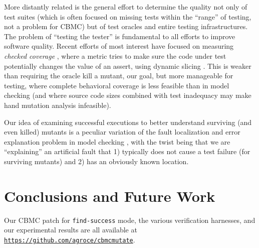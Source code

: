 \documentclass[conference]{IEEEtran}
\begin{document}
More distantly related is the general effort to determine the quality
not only of test suites (which is often focused on missing tests
within the ``range'' of testing, not a problem for CBMC) but of test
oracles and entire testing infrastructures.  The problem of ``testing
the tester'' \cite{WODA09} is fundamental to all efforts
to improve software quality.  Recent efforts of most interest have
focused on measuring \emph{checked coverage} \cite{CheckedCov,CheckedJournal,ThereYet}, where
a metric tries to make sure the code under test potentially changes
the value of an assert, using dynamic slicing \cite{DynSlice,Tip}.  This is weaker than requiring the oracle kill
a mutant, our goal, but more manageable for testing, where complete
behavioral coverage is less feasible than in model checking (and where
source code sizes combined with test inadequacy may make hand mutation analysis infeasible).

Our idea of examining successful executions to better understand
surviving (and even killed) mutants is a peculiar variation of the
fault localization and error explanation problem in model checking
\cite{GroceDist}, with the twist being that we are ``explaining'' an
artificial fault that 1) typically does not cause a test failure (for
surviving mutants) and 2) has an obviously known location.

\section{Conclusions and Future Work}

Our CBMC patch for {\tt find-success} mode, the various verification harnesses, and our
experimental results are all available at {\tt \url{https://github.com/agroce/cbmcmutate}}.



%







%
%
%



\end{document}
